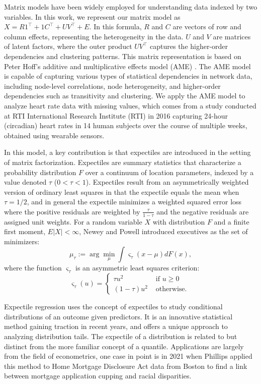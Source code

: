 \documentclass{article}
\begin{document}
Matrix models have been widely employed for understanding data indexed by two variables. In this work, we represent our matrix model as $X=R1^\top+1 C^{\top}+U V^{\top}+E$. In this formula, $R$  and $C$ are vectors of row and column effects, representing the heterogeneity in the data. $U$ and $V$ are matrices of latent factors, where the outer product $U V^{\top}$ captures the higher-order dependencies and clustering patterns. This matrix representation is based on Peter Hoff's additive and multiplicative effects model (AME) \cite{10.1214/19-STS757}. The AME model is capable of capturing various types of statistical dependencies in network data, including node-level correlations, node heterogeneity, and higher-order dependencies such as transitivity and clustering. We apply the AME model to analyze heart rate data with missing values, which comes from a study conducted at RTI International Research Institute
(RTI) in 2016 \cite{furberg_2016_53894} capturing 24-hour (circadian) heart rates in 14 human subjects over the course of multiple weeks, obtained using wearable sensors.

In this model, a key contribution is that expectiles are introduced in the setting of matrix factorization. Expectiles are summary statistics that characterize a probability distribution $F$ over a continuum of location parameters, indexed by a value denoted $\tau$ ($0 < \tau < 1$).  Expectiles result from an asymmetrically weighted version of ordinary least squares in that the expectile equals the mean when $\tau=1/2$, and in general the expectile minimizes a weighted squared error loss where the positive residuals are weighted by $\displaystyle\frac{\tau}{1-\tau}$ and the negative residuals are assigned unit weights. For a random variable $X$ with distribution $F$ and a finite first moment, $E|X|<\infty$, Newey and Powell \cite{newey1987asymmetric} introduced executives as the set of minimizers:
$$
\mu_\tau:=\arg \min _\mu \int \varsigma_\tau(x-\mu) d F(x),
$$
where the function $\varsigma_\tau$ is an asymmetric least squares criterion:
$$
\varsigma_\tau(u)= \begin{cases}\tau u^2 & \text { if } u \geq 0 \\ (1-\tau) u^2 & \text { otherwise. }\end{cases}
$$


Expectile regression uses the concept of expectiles to study conditional distributions of an outcome given predictors.  It is an innovative statistical method gaining traction in recent years, and offers a unique approach to analyzing distribution tails. The expectile of a distribution is related to but distinct from the more familiar concept of a quantile. Applications are largely from the field of econometrics, one case in point is in 2021 when Phillips \cite{philipps2021expectile} applied this method to Home Mortgage Disclosure Act data from Boston to find a link between mortgage application cupping and racial disparities. 
\end{document}

